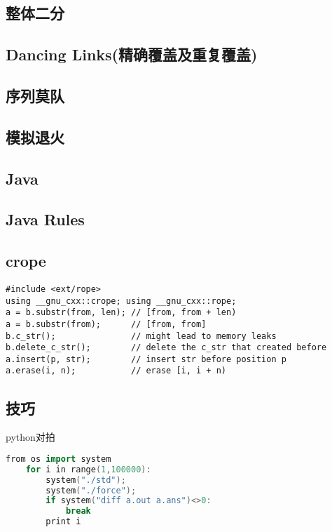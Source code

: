 \documentclass[landscape,a4paper]{article}
\begin{document}
\begin{spacing}{0.3}
\begin{multicols}{2}
		\subsection{整体二分}
		
		\subsection{Dancing Links(精确覆盖及重复覆盖)}
		
		\subsection{序列莫队}
		
		\subsection{模拟退火}
		
		\subsection{Java}
		
	\subsection{Java Rules}
	

	\subsection{crope}
	\begin{lstlisting}
#include <ext/rope>
using __gnu_cxx::crope; using __gnu_cxx::rope;
a = b.substr(from, len); // [from, from + len)
a = b.substr(from);      // [from, from]
b.c_str();               // might lead to memory leaks
b.delete_c_str();        // delete the c_str that created before
a.insert(p, str);        // insert str before position p
a.erase(i, n);           // erase [i, i + n)

	\end{lstlisting}	
	\end{multicols}

	\begin{multicols}{2}%

	

\section{技巧}
python对拍
\begin{lstlisting}[language=C++]
from os import system
	for i in range(1,100000):
		system("./std");
		system("./force");
		if system("diff a.out a.ans")<>0:
            break
		print i
\end{lstlisting}


\end{multicols}
\end{spacing}
\end{document}
